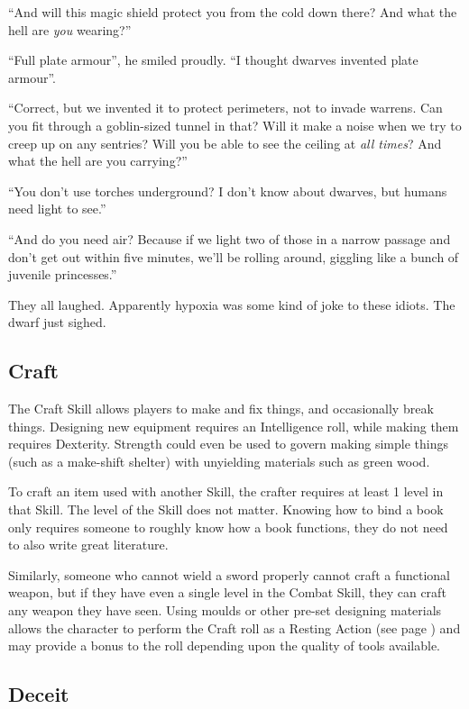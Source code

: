 \begin{multicols}{2}
\begin{exampletext}
  ``And will this magic shield protect you from the cold down there?
  And what the hell are \emph{you} wearing?''

  ``Full plate armour'', he smiled proudly.
  ``I thought dwarves invented plate armour''.

  ``Correct, but we invented it to protect perimeters, not to invade warrens.
  Can you fit through a goblin-sized tunnel in that?
  Will it make a noise when we try to creep up on any sentries?
  Will you be able to see the ceiling at \emph{all times}?
  And what the hell are you carrying?''

  ``You don't use torches underground?
  I don't know about dwarves, but humans need light to see.''

  ``And do you need air?
  Because if we light two of those in a narrow passage and don't get out within five minutes, we'll be rolling around, giggling like a bunch of juvenile princesses.''

  They all laughed.
  Apparently hypoxia was some kind of joke to these idiots.
  The dwarf just sighed.
  
\end{exampletext}

\subsection{Craft}

The Craft Skill allows players to make and fix things, and occasionally break things.
Designing new equipment requires an Intelligence roll, while making them requires Dexterity.
Strength could even be used to govern making simple things (such as a make-shift shelter) with unyielding materials such as green wood.

To craft an item used with another Skill, the crafter requires at least 1 level in that Skill.
The level of the Skill does not matter.
Knowing how to bind a book only requires someone to roughly know how a book functions, they do not need to also write great literature.

Similarly, someone who cannot wield a sword properly cannot craft a functional weapon, but if they have even a single level in the Combat Skill, they can craft any weapon they have seen.
Using moulds or other pre-set designing materials allows the character to perform the Craft roll as a Resting Action (see page \pageref{restingactions}) and may provide a bonus to the roll depending upon the quality of tools available.

\subsection{Deceit}


\end{multicols}
